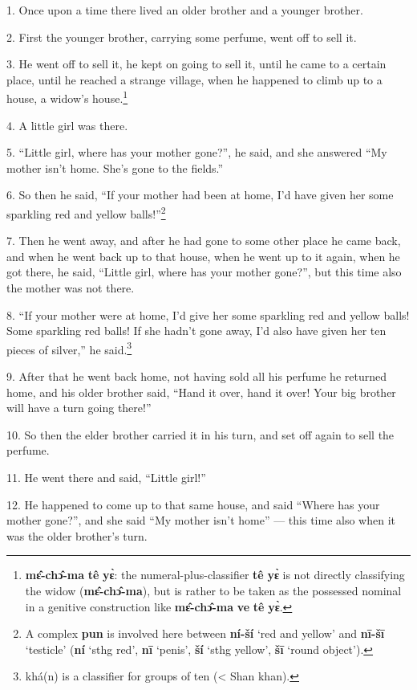 \setcounter{footnote}{0}

1. Once upon a time there lived an older brother and a younger brother.

2. First the younger brother, carrying some perfume, went off to sell it.

3. He went off to sell it, he kept on going to sell it, until he came to a certain
place, until he reached a strange village, when he happened to climb up to a house,
a widow's house.\footnote{\textbf{mɛ̂-chɔ̂-ma} \textbf{tê} \textbf{yɛ̀}: the numeral-plus-classifier \textbf{tê} \textbf{yɛ̀} is not directly classifying the widow (\textbf{mɛ̂-chɔ̂-ma}), but is rather to be taken as the possessed nominal in a genitive construction like \textbf{mɛ̂-chɔ̂-ma} \textbf{ve} \textbf{tê} \textbf{yɛ̀}.}

4. A little girl was there.

5. ``Little girl, where has your mother gone?'', he said, and she answered ``My
mother isn't home. She's gone to the fields.''

6. So then he said, ``If your mother had been at home, I'd have given her some sparkling
red and yellow balls!''\footnote{A complex \textbf{pun} is involved here between \textbf{ní-ší} `red and yellow' and \textbf{nī-šī} `testicle' (\textbf{ní} `sthg red', \textbf{nī} `penis', \textbf{ší} `sthg yellow', \textbf{šī} `round object').}

7. Then he went away, and after he had gone to some other place he came back, and
when he went back up to that house, when he went up to it again, when he got there,
he said, ``Little girl, where has your mother gone?'', but this time also the mother
was not there.

8. ``If your mother were at home, I'd give her some sparkling red and yellow balls!
Some sparkling red balls! If she hadn't gone away, I'd also have given her ten
pieces of silver,'' he said.\footnote{khá(n) is a classifier for groups of ten (< Shan khan).}

9. After that he went back home, not having sold all his perfume he returned home,
and his older brother said, ``Hand it over, hand it over! Your big brother will
have a turn going there!''

10. So then the elder brother carried it in his turn, and set off again to sell
the perfume.

11. He went there and said, ``Little girl!''

12. He happened to come up to that same house, and said ``Where has your mother
gone?'', and she said ``My mother isn't home'' --- this time also when it was the
older brother's turn.

